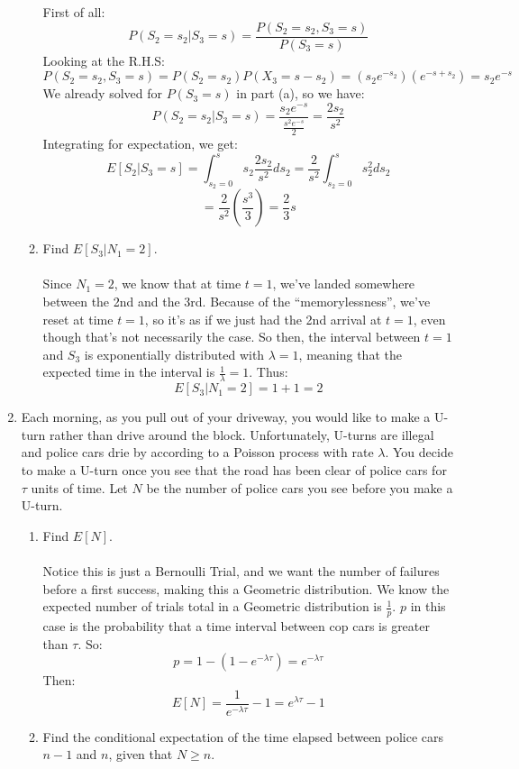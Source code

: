 \begin{enumerate}
\begin{enumerate}
        First of all:
        $$P(S_2 = s_2 | S_3 = s) = \frac{P(S_2 = s_2, S_3 = s)}{P(S_3 = s)}$$
        Looking at the R.H.S:
        $$P(S_2 = s_2, S_3 = s) = P(S_2 = s_2)P(X_3 = s-s_2) = (s_2e^{-s_2})(e^{-s + s_2}) = s_2e^{-s}$$
        We already solved for $P(S_3 = s)$ in part (a), so we have:
        $$P(S_2 = s_2 | S_3 = s) = \frac{s_2 e^{-s}}{\frac{s^2 e^{-s}}{2}} = \frac{2s_2}{s^2}$$
        Integrating for expectation, we get:
        $$E[S_2 | S_3 = s] = \int_{s_2=0}^s s_2 \frac{2s_2}{s^2} ds_2 = \frac{2}{s^2} \int_{s_2=0}^s s_2^2 ds_2$$
        $$=\frac{2}{s^2}(\frac{s^3}{3}) = \frac{2}{3} s$$
      \item Find $E[S_3 | N_1 = 2]$.\\\\

        Since $N_1 = 2$, we know that at time $t=1$, we've landed somewhere between the 2nd and the 3rd. Because of the ``memorylessness'', we've reset at time $t=1$, so it's as if we just had the 2nd arrival at $t=1$, even though that's not necessarily the case. So then, the interval between $t=1$ and $S_3$ is exponentially distributed with $\lambda=1$, meaning that the expected time in the interval is $\frac{1}{\lambda} = 1$. Thus:
        $$E[S_3 | N_1 = 2] = 1 + 1 = 2$$
    \end{enumerate}

  \item Each morning, as you pull out of your driveway, you would like to make a U-turn rather than drive around the block. Unfortunately, U-turns are illegal and police cars drie by according to a Poisson process with rate $\lambda$. You decide to make a U-turn once you see that the road has been clear of police cars for $\tau$ units of time. Let $N$ be the number of police cars you see before you make a U-turn.
    \begin{enumerate}
      \item Find $E[N]$.\\\\

        Notice this is just a Bernoulli Trial, and we want the number of failures before a first success, making this a Geometric distribution. We know the expected number of trials total in a Geometric distribution is $\frac{1}{p}$. $p$ in this case is the probability that a time interval between cop cars is greater than $\tau$. So:
        $$p = 1 - (1 - e^{-\lambda \tau}) = e^{-\lambda \tau}$$
        Then:
        $$E[N] = \frac{1}{e^{-\lambda \tau}} - 1 = e^{\lambda \tau} - 1$$
      \item Find the conditional expectation of the time elapsed between police cars $n-1$ and $n$, given that $N \geq n$.\\\\


\end{enumerate}
\end{enumerate}
